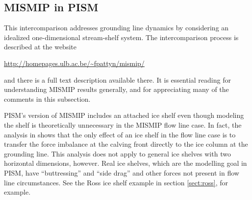 \documentclass[11pt,final]{amsart}
\begin{document}

\subsection{MISMIP in PISM}\label{subsect:MISMIP}  This intercomparison addresses grounding line dynamics by considering an idealized one-dimensional stream-shelf system.  The intercomparison process is described at the website

\centerline{\url{http://homepages.ulb.ac.be/~fpattyn/mismip/}}

\noindent and there is a full text description available there.  It is essential reading for understanding MISMIP results generally, and for appreciating many of the comments in this subsection.

PISM's version of MISMIP includes an attached ice shelf even though modeling the shelf is theoretically unnecessary in the MISMIP flow line case.  In fact, the analysis in \cite{SchoofMarine1} shows that the only effect of an ice shelf in the flow line case is to transfer the force imbalance at the calving front directly to the ice column at the grounding line.  This analysis does not apply to general ice shelves with two horizontal dimensions, however.  Real ice shelves, which are the modelling goal in PISM, have ``buttressing'' and ``side drag'' and other forces not present in flow line circumstances.  See the Ross ice shelf example in section \ref{sect:ross}, for example.
\end{document}
